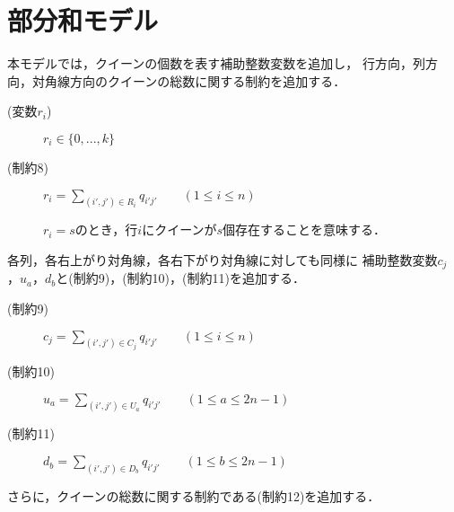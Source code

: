 \newpage
\section{部分和モデル}
本モデルでは，クイーンの個数を表す補助整数変数を追加し，
行方向，列方向，対角線方向のクイーンの総数に関する制約を追加する．
\begin{description}
 \item[(変数$r_i$)] $r_{i} \in \{0,...,k\}$ 
 \item[(制約8)] $r_{i} = \sum\limits _{(i',j') \in R_{i}} q_{i'j'} \qquad (1 \leq i \leq n)$ \par
$r_i = s$のとき，行$i$にクイーンが$s$個存在することを意味する．
\end{description}
%
各列，各右上がり対角線，各右下がり対角線に対しても同様に
補助整数変数$c_j$，$u_{a}$，$d_{b}$と(制約9)，(制約10)，(制約11)を追加する．
%
\begin{description}
 \item[(制約9)] $c_{j} = \sum\limits _{(i',j') \in C_{j}} q_{i'j'} \qquad (1 \leq i \leq n)$
 \item[(制約10)] $u_{a} = \sum\limits _{(i',j') \in U_{a}} q_{i'j'}\qquad (1 \leq a \leq 2n-1)$
 \item[(制約11)] $d_{b} = \sum\limits _{(i',j') \in D_{b}} q_{i'j'} \qquad(1 \leq b \leq 2n-1)$
\end{description}
さらに，クイーンの総数に関する制約である(制約12)を追加する．
